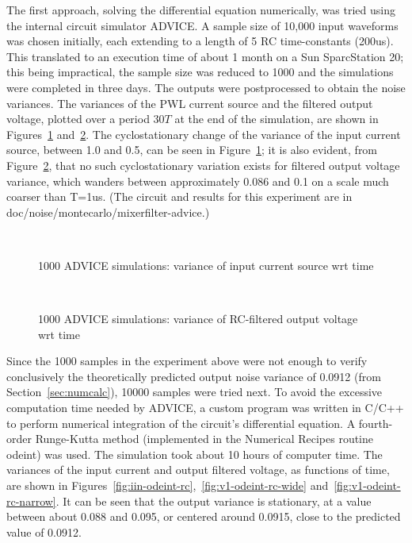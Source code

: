 The first approach, solving the differential equation numerically, was tried
using the internal circuit simulator ADVICE. A sample size of 10,000 input
waveforms was chosen initially, each extending to a length of 5 RC
time-constants (200us). This translated to an execution time of
about 1 month on a Sun SparcStation 20; this being impractical, the sample
size was reduced to 1000 and the simulations were completed in three days.
The outputs were postprocessed to obtain the noise variances. The variances
of the PWL current source and the filtered output voltage, plotted over a
period $30T$ at the end of the simulation, are shown in
Figures~\ref{fig:iin-rc-advice} and~\ref{fig:v1-rc-advice}. The
cyclostationary change of the variance of the input current source, between
1.0 and 0.5, can be seen in Figure~\ref{fig:iin-rc-advice}; it
is also evident, from Figure~\ref{fig:v1-rc-advice}, that no such
cyclostationary variation exists for filtered output voltage variance, which
wanders between approximately 0.086 and 0.1 on a scale much coarser than
T=1us.  (The circuit and results for this experiment are in
{\sf doc/noise/montecarlo/mixerfilter-advice}.)

\begin{figure}[htbp]
\centerline{\ }
\caption{1000 ADVICE simulations: variance of input current source wrt time}
\label{fig:iin-rc-advice}
\end{figure}
\begin{figure}[htbp]
\centerline{\ }
\caption{1000 ADVICE simulations: variance of RC-filtered output voltage wrt time}
\label{fig:v1-rc-advice}
\end{figure}

Since the 1000 samples in the experiment above were not enough to verify
conclusively the theoretically predicted output noise variance of 0.0912
(from Section~\ref{sec:numcalc}), 10000 samples were tried next. To avoid
the excessive computation time needed by ADVICE, a custom program was
written in C/C++ to perform numerical integration of the circuit's
differential equation. A fourth-order Runge-Kutta method (implemented in the
Numerical Recipes routine {\sf odeint}) was used. The simulation took about
10 hours of computer time. The variances of the input current and output
filtered voltage, as functions of time, are shown in
Figures~\ref{fig:iin-odeint-rc},~\ref{fig:v1-odeint-rc-wide}
and~\ref{fig:v1-odeint-rc-narrow}. It can be seen that the output variance
is stationary, at a value between about 0.088 and 0.095, or centered around
0.0915, close to the predicted value of 0.0912.

